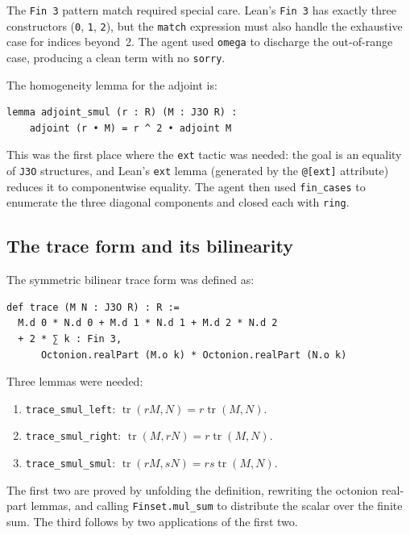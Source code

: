 \documentclass[11pt]{article}
\theoremstyle{definition}
\DeclareMathOperator{\tr}{tr}
\begin{document}
The \texttt{Fin 3} pattern match required special care. Lean's
\texttt{Fin 3} has exactly three constructors (\texttt{0}, \texttt{1},
\texttt{2}), but the \texttt{match} expression must also handle the
exhaustive case for indices beyond~2. The agent used \texttt{omega} to
 discharge the out-of-range case, producing a clean term with no
\texttt{sorry}.

The homogeneity lemma for the adjoint is:

\begin{lstlisting}[language=leanL]
lemma adjoint_smul (r : R) (M : J3O R) :
    adjoint (r • M) = r ^ 2 • adjoint M
\end{lstlisting}

This was the first place where the \texttt{ext} tactic was needed: the
goal is an equality of \texttt{J3O} structures, and Lean's \texttt{ext}
lemma (generated by the \texttt{@[ext]} attribute) reduces it to
componentwise equality. The agent then used \texttt{fin\_cases} to
enumerate the three diagonal components and closed each with \texttt{ring}.

\subsection{The trace form and its bilinearity}
\label{sec:agent-trace}

The symmetric bilinear trace form was defined as:

\begin{lstlisting}[language=leanL]
def trace (M N : J3O R) : R :=
  M.d 0 * N.d 0 + M.d 1 * N.d 1 + M.d 2 * N.d 2
  + 2 * ∑ k : Fin 3,
      Octonion.realPart (M.o k) * Octonion.realPart (N.o k)
\end{lstlisting}

Three lemmas were needed:

\begin{enumerate}[leftmargin=2em]
\item \texttt{trace\_smul\_left}: $\tr(rM,N)=r\tr(M,N)$.
\item \texttt{trace\_smul\_right}: $\tr(M,rN)=r\tr(M,N)$.
\item \texttt{trace\_smul\_smul}: $\tr(rM,sN)=rs\tr(M,N)$.
\end{enumerate}

The first two are proved by unfolding the definition, rewriting the
octonion real-part lemmas, and calling \texttt{Finset.mul\_sum} to
distribute the scalar over the finite sum. The third follows by two
applications of the first two.
\end{document}
